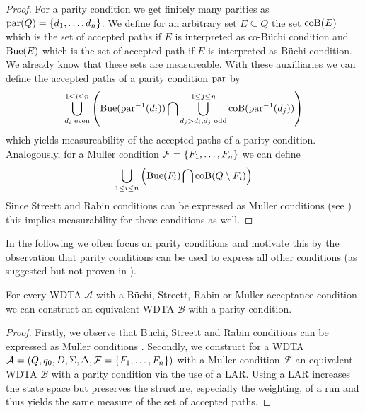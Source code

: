 \begin{proof}
  For a parity condition we get finitely many parities as
  $\operatorname{par}(Q) = \left\{d_{1},\dots,d_{n}\right\}$. We define for an arbitrary set
  $E\subseteq Q$ the set $\operatorname{coB}(E)$ which is the set of accepted paths if
  $E$ is interpreted as co-Büchi condition and $\operatorname{Bue}(E)$ which is the set of
  accepted path if $E$ is interpreted as Büchi condition. We already know that
  these sets are measureable. With these auxilliaries we can define the
  accepted paths of a parity condition $\operatorname{par}$ by
  \begin{equation}
    \bigcup\limits^{1\leq i\leq n}_{d_{i}\text{ even}}\left(\operatorname{Bue}(\operatorname{par}^{-1}(d_{i}))
    \bigcap\bigcup\limits^{1\leq j\leq n}_{d_{j} > d_{i}, d_{j}\text{ odd}}
    \operatorname{coB}(\operatorname{par}^{-1}(d_{j}))\right)
  \end{equation}
  which yields measureability of the accepted paths of a parity condition.
  Analogously, for a Muller condition $\mathcal{F} = \left\{F_{1},\dots,F_{n}\right\}$
  we can define
  \begin{equation}
    \bigcup\limits_{1\leq i\leq n}
    \left(\operatorname{Bue}(F_{i})\bigcap\operatorname{coB}(Q\setminus F_{i})\right)
  \end{equation}
  Since Streett and Rabin conditions can be expressed as Muller conditions
  (see \cite[Proposition 5.3]{LangAutoLog}) this implies measurability for
  these conditions as well.
\end{proof}
In the following we often focus on parity conditions and motivate this by the
observation that parity conditions can be used to express all other conditions
(as suggested but not proven in \cite[page 24:9]{RandAutoInfTrees}).
\begin{lemma}
  For every \ac{WDTA} $\mathcal{A}$ with a Büchi, Streett, Rabin or Muller
  acceptance condition we can construct an equivalent \ac{WDTA} $\mathcal{B}$
  with a parity condition.
\end{lemma}
\begin{proof}
  Firstly, we observe that Büchi, Streett and Rabin conditions can be expressed
  as Muller conditions \cite[Proposition 5.3]{LangAutoLog}. Secondly, we
  construct for a \ac{WDTA} $\mathcal{A} = \left(Q, q_{0}, D, \Sigma, \Delta,
  \mathcal{F} = \left\{F_{1},\dots,F_{n}\right\}\right)$ with a Muller condition $\mathcal{F}$
  an equivalent \ac{WDTA} $\mathcal{B}$ with a parity condition via the use of
  a \ac{LAR}. 
  Using a \ac{LAR} increases the state space but preserves the structure,
  especially the weighting, of a run and thus yields the same measure of the
  set of accepted paths.
\end{proof}
